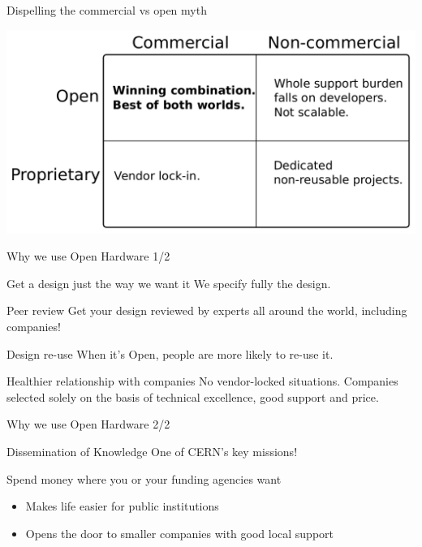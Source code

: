 \documentclass[compress, red]{beamer}
\begin{document}
\begin{frame}{Dispelling the commercial vs open myth}
 \begin{center}
   \includegraphics[width=\textwidth]{ohwr/commercial_and_open.pdf}
 \end{center} 
\end{frame}

\begin{frame}{Why we use Open Hardware 1/2}
\pause
	\begin{block}{Get a design just the way we want it}
We specify fully the design.
	\end{block}	
\pause
	\begin{block}{Peer review}
	 Get your design reviewed by experts all around the world, including companies!
	\end{block}
\pause
\begin{block}{Design re-use}
  When it's Open, people are more likely to re-use it.
	\end{block}
\pause
	\begin{block}{Healthier relationship with companies}
          No vendor-locked situations. Companies selected solely on the basis of technical excellence, good support and price.
	\end{block}
\end{frame}

\begin{frame}{Why we use Open Hardware 2/2}
\pause
\begin{block}{Dissemination of Knowledge}
 One of CERN's key missions!
\end{block}
\pause
\begin{block}{Spend money where you or your funding agencies want}
 \begin{itemize}
   \item Makes life easier for public institutions
   \item Opens the door to smaller companies with good local support
  \end{itemize}
\end{block}	

\end{frame}
\end{document}
